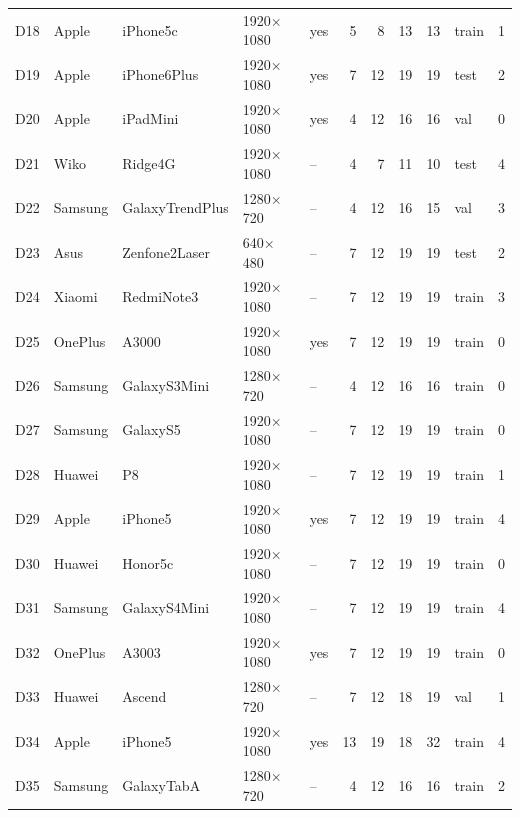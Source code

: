 \documentclass[11pt,a4paper]{article}
\begin{document}
{\begin{longtable}{lllllrrrrlr}
D18 & Apple & iPhone5c & 1920$\times$1080 & yes & 5 & 8 & 13 & 13 & train & 1 \\
D19 & Apple & iPhone6Plus & 1920$\times$1080 & yes & 7 & 12 & 19 & 19 & test & 2 \\
D20 & Apple & iPadMini & 1920$\times$1080 & yes & 4 & 12 & 16 & 16 & val & 0 \\
D21 & Wiko & Ridge4G & 1920$\times$1080 & -- & 4 & 7 & 11 & 10 & test & 4 \\
D22 & Samsung & GalaxyTrendPlus & 1280$\times$720 & -- & 4 & 12 & 16 & 15 & val & 3 \\
D23 & Asus & Zenfone2Laser & 640$\times$480 & -- & 7 & 12 & 19 & 19 & test & 2 \\
D24 & Xiaomi & RedmiNote3 & 1920$\times$1080 & -- & 7 & 12 & 19 & 19 & train & 3 \\
D25 & OnePlus & A3000 & 1920$\times$1080 & yes & 7 & 12 & 19 & 19 & train & 0 \\
D26 & Samsung & GalaxyS3Mini & 1280$\times$720 & -- & 4 & 12 & 16 & 16 & train & 0 \\
D27 & Samsung & GalaxyS5 & 1920$\times$1080 & -- & 7 & 12 & 19 & 19 & train & 0 \\
D28 & Huawei & P8 & 1920$\times$1080 & -- & 7 & 12 & 19 & 19 & train & 1 \\
D29 & Apple & iPhone5 & 1920$\times$1080 & yes & 7 & 12 & 19 & 19 & train & 4 \\
D30 & Huawei & Honor5c & 1920$\times$1080 & -- & 7 & 12 & 19 & 19 & train & 0 \\
D31 & Samsung & GalaxyS4Mini & 1920$\times$1080 & -- & 7 & 12 & 19 & 19 & train & 4 \\
D32 & OnePlus & A3003 & 1920$\times$1080 & yes & 7 & 12 & 19 & 19 & train & 0 \\
D33 & Huawei & Ascend & 1280$\times$720 & -- & 7 & 12 & 18 & 19 & val & 1 \\
D34 & Apple & iPhone5 & 1920$\times$1080 & yes & 13 & 19 & 18 & 32 & train & 4 \\
D35 & Samsung & GalaxyTabA & 1280$\times$720 & -- & 4 & 12 & 16 & 16 & train & 2 \\
\end{longtable}
}
\end{document}
